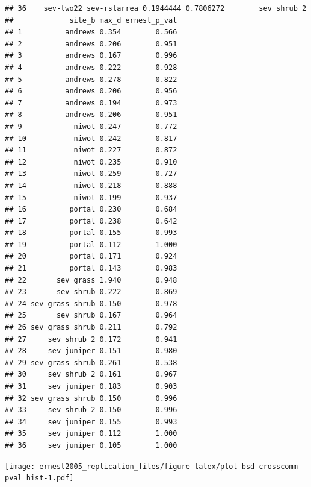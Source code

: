 \documentclass[]{article}
\begin{document}
\begin{verbatim}
## 36    sev-two22 sev-rslarrea 0.1944444 0.7806272        sev shrub 2
##             site_b max_d ernest_p_val
## 1          andrews 0.354        0.566
## 2          andrews 0.206        0.951
## 3          andrews 0.167        0.996
## 4          andrews 0.222        0.928
## 5          andrews 0.278        0.822
## 6          andrews 0.206        0.956
## 7          andrews 0.194        0.973
## 8          andrews 0.206        0.951
## 9            niwot 0.247        0.772
## 10           niwot 0.242        0.817
## 11           niwot 0.227        0.872
## 12           niwot 0.235        0.910
## 13           niwot 0.259        0.727
## 14           niwot 0.218        0.888
## 15           niwot 0.199        0.937
## 16          portal 0.230        0.684
## 17          portal 0.238        0.642
## 18          portal 0.155        0.993
## 19          portal 0.112        1.000
## 20          portal 0.171        0.924
## 21          portal 0.143        0.983
## 22       sev grass 1.940        0.948
## 23       sev shrub 0.222        0.869
## 24 sev grass shrub 0.150        0.978
## 25       sev shrub 0.167        0.964
## 26 sev grass shrub 0.211        0.792
## 27     sev shrub 2 0.172        0.941
## 28     sev juniper 0.151        0.980
## 29 sev grass shrub 0.261        0.538
## 30     sev shrub 2 0.161        0.967
## 31     sev juniper 0.183        0.903
## 32 sev grass shrub 0.150        0.996
## 33     sev shrub 2 0.150        0.996
## 34     sev juniper 0.155        0.993
## 35     sev juniper 0.112        1.000
## 36     sev juniper 0.105        1.000
\end{verbatim}

\texttt{[image: ernest2005\_replication\_files/figure-latex/plot bsd crosscomm pval hist-1.pdf]}
\end{document}
